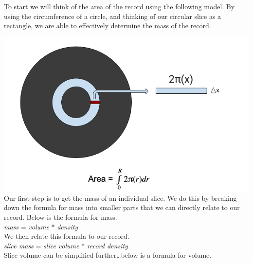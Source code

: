 \documentclass[a4paper, 11pt, oneside]{book} %
\begin{document}
To start we will think of the area of the record using the following model. By using the circumference of a circle, and thinking of our circular slice as a rectangle, we are able to effectively determine the mass of the record.

\includegraphics[scale=0.38]{record1}\\
Our first step is to get the mass of an individual slice. We do this by breaking down the formula for mass into smaller parts that we can directly relate to our record. Below is the formula for mass.\\
\vspace{0.5\baselineskip} %
\vspace{0.5\baselineskip} %
\textit{mass} = \textit{volume} $*$ \textit{density} \\
\vspace{0.5\baselineskip} %
\vspace{0.5\baselineskip} %
We then relate this formula to our record.\\
\vspace{0.5\baselineskip} %
\vspace{0.5\baselineskip} %
\textit{slice mass} = \textit{slice volume} $*$ \textit{record density}\\
\vspace{0.5\baselineskip} %
\vspace{0.5\baselineskip} %
Slice volume can be simplified further\dots below is a formula for volume.\\
\vspace{0.5\baselineskip} %
\end{document}
